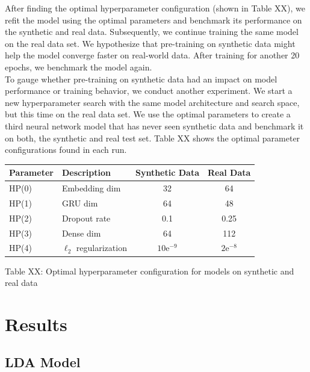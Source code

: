 \documentclass[11pt]{article}
\begin{document}
\noindent After finding the optimal hyperparameter configuration (shown in Table XX), we refit the model using the optimal parameters and benchmark its performance on the synthetic and real data. Subsequently, we continue training the same model on the real data set. We hypothesize that pre-training on synthetic data might help the model converge faster on real-world data. After training for another 20 epochs, we benchmark the model again.
\\[5pt]
\noindent To gauge whether pre-training on synthetic data had an impact on model performance or training behavior, we conduct another experiment. We start a new hyperparameter search with the same model architecture and search space, but this time on the real data set. We use the optimal parameters to create a third neural network model that has never seen synthetic data and benchmark it on both, the synthetic and real test set. Table XX shows the optimal parameter configurations found in each run.


\begin{center}
\begin{tabular}{llcc}
\toprule
    Parameter & Description & Synthetic Data & Real Data \\
\midrule
    HP(0) & Embedding dim & 32 & 64\\
    HP(1) & GRU dim & 64 & 48\\
    HP(2) & Dropout rate & 0.1 & 0.25\\
    HP(3) & Dense dim & 64 & 112\\
    HP(4) & $\ell_2$ regularization & $10\mathrm{e}^{-9}$ & $2\mathrm{e}^{-8}$\\
\bottomrule
\end{tabular}
\end{center}
\begin{center}
	Table XX: Optimal hyperparameter configuration for models on synthetic and real data
\end{center}


\section{Results}
\subsection{LDA Model}
\end{document}
